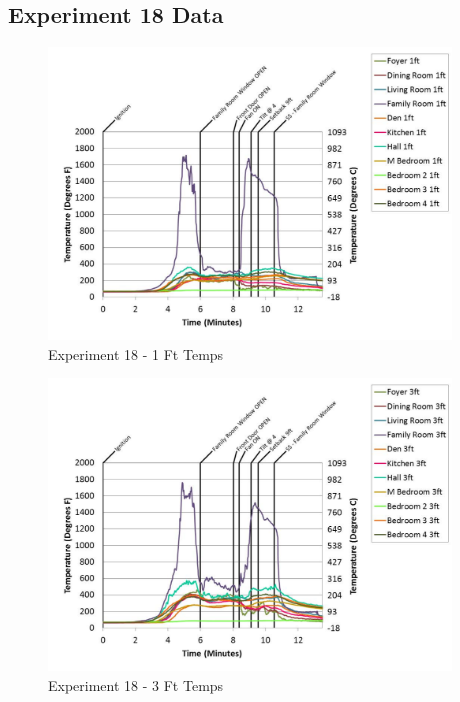 \documentclass{article}
\begin{document}
\begin{appendices}
	\clearpage

		\clearpage
\clearpage		\large
\subsection{Experiment 18 Data} \label{App:Exp18Results} 

	\begin{figure}[h!]
		\centering
		\includegraphics[height=3.05in]{0_Images/Results_Charts/Exp_18_Charts/1FtTemps.pdf}
		\caption{Experiment 18 - 1 Ft Temps}
	\end{figure}
 

	\begin{figure}[h!]
		\centering
		\includegraphics[height=3.05in]{0_Images/Results_Charts/Exp_18_Charts/3FtTemps.pdf}
		\caption{Experiment 18 - 3 Ft Temps}
	\end{figure}
 
	\clearpage


\end{appendices}
\end{document}
